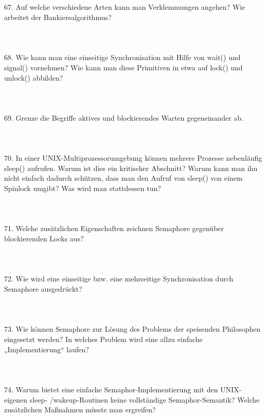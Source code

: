 \documentclass{article}
\begin{document}
\\
\\
\\
\\
67. Auf welche verschiedene Arten kann man Verklemmungen angehen? Wie arbeitet der
Bankiersalgorithmus?
\\
\\
\\
\\
68. Wie kann man eine einseitige Synchronisation mit Hilfe von wait() und signal() vornehmen? Wie kann man diese Primitiven in etwa auf lock() und unlock() abbilden?
\\
\\
\\
\\
69. Grenze die Begriffe aktives und blockierendes Warten gegeneinander ab.
\\
\\
\\
\\
70. In einer UNIX-Multiprozessorumgebung können mehrere Prozesse nebenläufig sleep()
aufrufen. Warum ist dies ein kritischer Abschnitt? Warum kann man ihn nicht einfach
dadurch schützen, dass man den Aufruf von sleep() von einem Spinlock umgibt? Was
wird man stattdessen tun?
\\
\\
\\
\\
71. Welche zusätzlichen Eigenschaften zeichnen Semaphore gegenüber blockierenden Locks
aus?
\\
\\
\\
\\
72. Wie wird eine einseitige bzw. eine mehrseitige Synchronisation durch Semaphore ausgedrückt?
\\
\\
\\
\\
73. Wie können Semaphore zur Lösung des Problems der speisenden Philosophen eingesetzt
werden? In welches Problem wird eine allzu einfache „Implementierung“ laufen?
\\
\\
\\
\\
74. Warum bietet eine einfache Semaphor-Implementierung mit den UNIX-eigenen sleep-
/wakeup-Routinen keine vollständige Semaphor-Semantik? Welche zusätzlichen Maßnahmen
müsste man ergreifen?
\\
\\
\end{document}
